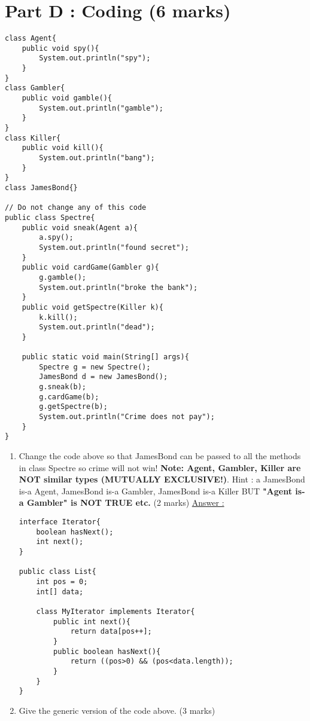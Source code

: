 \documentclass{article}
\begin{document}
\section{Part D : Coding (6 marks)}
\begin{lstlisting}
class Agent{
	public void spy(){
		System.out.println("spy");
	}
}
class Gambler{
	public void gamble(){
		System.out.println("gamble");
	}
}
class Killer{
	public void kill(){
		System.out.println("bang");
	}
}
class JamesBond{}

// Do not change any of this code
public class Spectre{
	public void sneak(Agent a){
		a.spy();
		System.out.println("found secret");
	}
	public void cardGame(Gambler g){
		g.gamble();
		System.out.println("broke the bank");
	}
	public void getSpectre(Killer k){
		k.kill();
		System.out.println("dead");
	}
	
	public static void main(String[] args){
		Spectre g = new Spectre();
		JamesBond d = new JamesBond();
		g.sneak(b);
		g.cardGame(b);
		g.getSpectre(b);
		System.out.println("Crime does not pay");
	}
}
\end{lstlisting}
\begin{enumerate}[resume]
	\item Change the code above so that JamesBond can be passed to all the methods in class Spectre so crime will not win! \textbf{Note: Agent, Gambler, Killer are NOT similar types (MUTUALLY EXCLUSIVE!)}. Hint : a JamesBond is-a Agent, JamesBond is-a Gambler, JamesBond is-a Killer BUT \textbf{"Agent is-a Gambler" is NOT TRUE etc.} (2 marks)
	\newpage
	\underline{Answer :}
	\newpage
	\begin{lstlisting}
interface Iterator{
	boolean hasNext();
	int next();
}

public class List{
	int pos = 0;
	int[] data;
	
	class MyIterator implements Iterator{
		public int next(){
			return data[pos++];
		}
		public boolean hasNext(){
			return ((pos>0) && (pos<data.length));
		}
	}
}
	\end{lstlisting}
	\item Give the generic version of the code above. (3 marks)
\end{enumerate}
\end{document}
